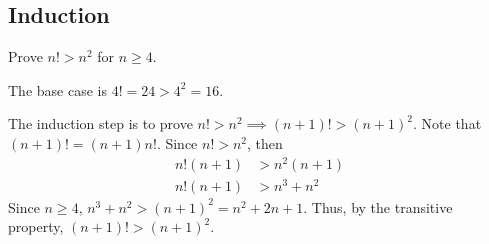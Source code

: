 \documentclass[a4paper]{article}
\begin{document}
\subsection{Induction}

Prove \(n! > n^2\) for \(n \geq 4\).

The base case is \(4!=24 > 4^2 = 16\).

The induction step is to prove \(n! > n^2 \implies (n +1)! > {(n+1)}^2\).
Note that \((n+1)!=(n+1)n!\).
Since \(n! > n^2\), then
\begin{align*}
    n!(n+1) &> n^2(n+1) \\
    n!(n+1) &> n^3 + n^2
\end{align*}
Since \(n \geq 4\), \(n^3 + n^2 > {(n+1)}^2=n^2+2n+1\).
Thus, by the transitive property, \((n+1)! > {(n+1)}^2\).
\end{document}
